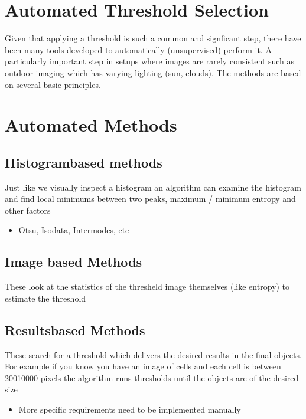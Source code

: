 \documentclass[letterpaper,10pt,english]{sphinxmanual}
\begin{document}
\noindent{}


\section{Automated Threshold Selection}
\label{\detokenize{05-AdvancedSegmentation:automated-threshold-selection}}
\sphinxAtStartPar
{}

\sphinxAtStartPar
Given that applying a threshold is such a common and signficant step, there have been many tools developed to automatically (unsupervised) perform it. A particularly important step in setups where images are rarely consistent such as outdoor imaging which has varying lighting (sun, clouds). The methods are based on several basic principles.


\section{Automated Methods}
\label{\detokenize{05-AdvancedSegmentation:automated-methods}}

\subsection{Histogram\sphinxhyphen{}based methods}
\label{\detokenize{05-AdvancedSegmentation:histogram-based-methods}}
\sphinxAtStartPar
Just like we visually inspect a histogram an algorithm can examine the histogram and find local minimums between two peaks, maximum / minimum entropy and other factors
\begin{itemize}
\item {} 
\sphinxAtStartPar
Otsu, Isodata, Intermodes, etc

\end{itemize}


\subsection{Image based Methods}
\label{\detokenize{05-AdvancedSegmentation:image-based-methods}}
\sphinxAtStartPar
These look at the statistics of the thresheld image themselves (like entropy) to estimate the threshold


\subsection{Results\sphinxhyphen{}based Methods}
\label{\detokenize{05-AdvancedSegmentation:results-based-methods}}
\sphinxAtStartPar
These search for a threshold which delivers the desired results in the final objects. For example if you know you have an image of cells and each cell is between 200\sphinxhyphen{}10000 pixels the algorithm runs thresholds until the objects are of the desired size
\begin{itemize}
\item {} 
\sphinxAtStartPar
More specific requirements need to be implemented manually

\end{itemize}
\end{document}
